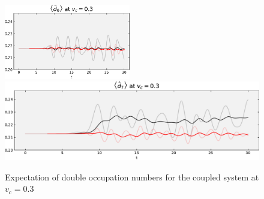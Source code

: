 \begin{figure}[!hbt]
\begin{minipage}[b]{.49\textwidth}
                \includegraphics[width=0.49\textwidth]{graph/double_occupation/double_occupation_vc_03_site_6.pdf}
                \includegraphics[width=1.00\textwidth]{graph/double_occupation/double_occupation_vc_03_site_7.pdf}
        \caption{Expectation of double occupation numbers for the coupled system at $v_c = 0.3$}
        \label{fig:double_occupation_vc_03}
    \end{minipage}
\end{figure}


